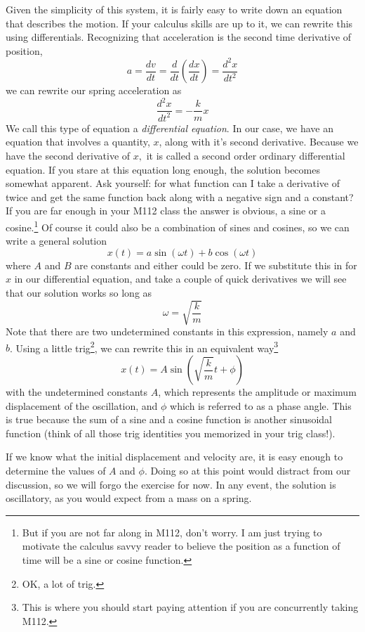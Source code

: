 \documentclass[twoside,11pt,ShortChapTitles]{BYUTextbook}
\begin{document}
Given the simplicity of this system, it is fairly easy to write down an
equation that describes the motion. If your calculus skills are up to it, we
can rewrite this using differentials. Recognizing that acceleration is the
second time derivative of position, 
\[
a=\frac{dv}{dt}=\frac{d}{dt}\left( \frac{dx}{dt}\right) =\frac{d^{2}x}{dt^{2}%
} 
\]%
we can rewrite our spring acceleration as 
\[
\frac{d^{2}x}{dt^{2}}=-\frac{k}{m}x 
\]%
We call this type of equation a \emph{differential equation}. In our case,
we have an equation that involves a quantity, $x$, along with it's second
derivative. Because we have the second derivative of $x,$ it is called a
second order ordinary differential equation. If you stare at this equation
long enough, the solution becomes somewhat apparent. Ask yourself: for what
function can I take a derivative of twice and get the same function back
along with a negative sign and a constant? If you are far enough in your
M112 class the answer is obvious, a sine or a cosine.\footnote{%
But if you are not far along in M112, don't worry. I am just trying to
motivate the calculus savvy reader to believe the position as a function of
time will be a sine or cosine function.} Of course it could also be a
combination of sines and cosines, so we can write a general solution 
\[
x(t)=a\sin \left( \omega t\right) +b\cos \left( \omega t\right) 
\]%
where $A$ and $B$ are constants and either could be zero. If we substitute
this in for $x$ in our differential equation, and take a couple of quick
derivatives we will see that our solution works so long as 
\[
\omega =\sqrt{\frac{k}{m}} 
\]%
Note that there are two undetermined constants in this expression, namely $a$
and $b$. Using a little trig\footnote{%
OK, a lot of trig.}, we can rewrite this in an equivalent way\footnote{%
This is where you should start paying attention if you are concurrently
taking M112.} 
\[
x(t)=A\sin \left( \sqrt{\frac{k}{m}}t+\phi \right) 
\]%
with the undetermined constants $A$, which represents the amplitude or
maximum displacement of the oscillation, and $\phi $ which is referred to as
a phase angle. This is true because the sum of a sine and a cosine function
is another sinusoidal function (think of all those trig identities you
memorized in your trig class!).

If we know what the initial displacement and velocity are, it is easy enough
to determine the values of $A$ and $\phi $. Doing so at this point would
distract from our discussion, so we will forgo the exercise for now. In any
event, the solution is oscillatory, as you would expect from a mass on a
spring.
\end{document}
